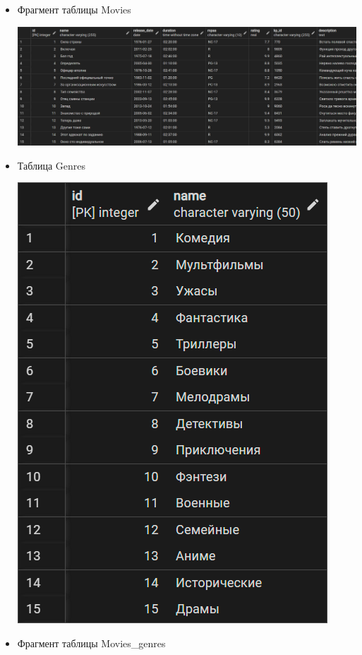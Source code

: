 \documentclass[a4paper,12pt]{article}
\renewcommand{\^}[2]{#1^{\, #2} \kern -1pt}
\newcommand{\1}{\kern 1pt}
\newcommand{\0}{\kern -1pt}
\begin{document}
	\begin{itemize}
		
	\item Фрагмент таблицы Movies

	\includegraphics[scale=0.55,page=1]{table_inserts_examples/Movies}
	
	
	\item Таблица Genres
	
	\includegraphics[scale=0.3,page=1]{table_inserts_examples/Genres}
	
	
	\item Фрагмент таблицы Movies\_genres
	

\end{itemize}
\end{document}
